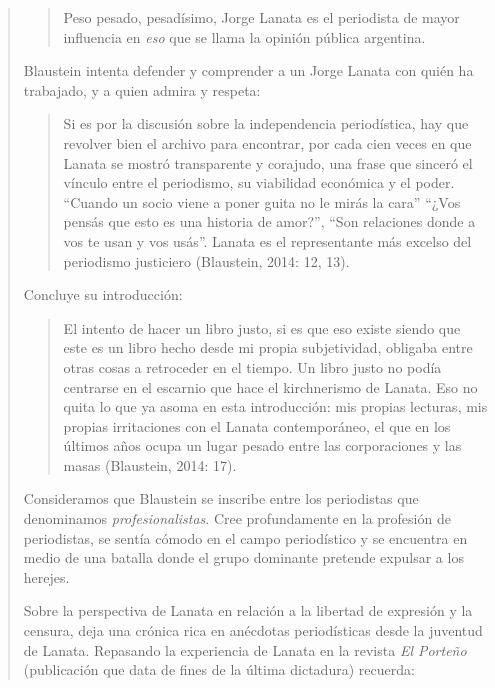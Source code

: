 \begin{quote}
\begin{quote}
	Peso pesado, pesadísimo, Jorge Lanata es el periodista de mayor influencia en \emph{eso} que se llama la opinión pública argentina.
\end{quote}


Blaustein intenta defender y comprender a un Jorge Lanata con quién ha trabajado, y a quien admira y respeta:

\begin{quote}
	Si es por la discusión sobre la independencia periodística, hay que revolver bien el archivo para encontrar, por cada cien veces en que Lanata se mostró transparente y corajudo, una frase que sinceró el vínculo entre el periodismo, su viabilidad económica y el poder. \enquote{Cuando un socio viene a poner guita no le mirás la cara} \enquote{¿Vos pensás que esto es una historia de amor?}, \enquote{Son relaciones donde a vos te usan y vos usás}. Lanata es el representante más excelso del periodismo justiciero (Blaustein, 2014: 12, 13).
\end{quote}


Concluye su introducción:

\begin{quote}
	El intento de hacer un libro justo, si es que eso existe siendo que este es un libro hecho desde mi propia subjetividad, obligaba entre otras cosas a retroceder en el tiempo. Un libro justo no podía centrarse en el escarnio que hace el kirchnerismo de Lanata. Eso no quita lo que ya asoma en esta introducción: mis propias lecturas, mis propias irritaciones con el Lanata contemporáneo, el que en los últimos años ocupa un lugar pesado  entre las corporaciones y las masas (Blaustein, 2014: 17).
\end{quote}


Consideramos que Blaustein se inscribe entre los periodistas que denominamos \emph{profesionalistas}. Cree profundamente en la profesión de periodistas, se sentía cómodo en el campo periodístico y se encuentra en medio de una batalla donde el grupo dominante pretende expulsar a los herejes.

Sobre la perspectiva de Lanata en relación a la libertad de expresión y la censura, deja una crónica rica en anécdotas periodísticas desde la juventud de Lanata. Repasando la experiencia de Lanata en la revista \emph{El Porteño} (publicación que data de fines de la última dictadura) recuerda:


\end{quote}
